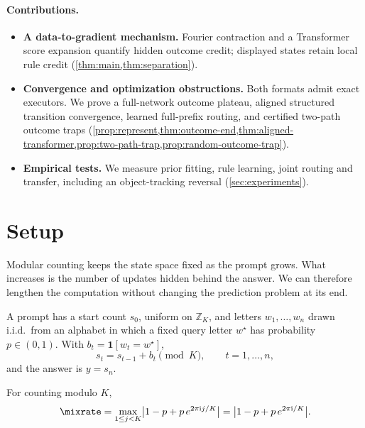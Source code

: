 \paragraph{Contributions.}
\begin{itemize}[leftmargin=*,itemsep=3pt,topsep=3pt]
\item \textbf{A data-to-gradient mechanism.} Fourier contraction and a Transformer
score expansion quantify hidden outcome credit; displayed states retain local rule
credit (\cref{thm:main,thm:separation}).
\item \textbf{Convergence and optimization obstructions.} Both formats admit
exact executors. We prove a full-network outcome plateau, aligned structured
transition convergence, learned full-prefix routing, and certified two-path outcome traps
(\cref{prop:represent,thm:outcome-end,thm:aligned-transformer,prop:two-path-trap,prop:random-outcome-trap}).
\item \textbf{Empirical tests.} We measure prior fitting, rule learning, joint routing
and transfer, including an object-tracking reversal (\cref{sec:experiments}).
\end{itemize}

\section{Setup}
\label{sec:setup}
\label{sec:setting}

Modular counting keeps the state space fixed as the prompt grows. What increases is the number of updates hidden behind the
answer. We can therefore lengthen the computation without changing the prediction problem at its end.

\begin{definition}
\label{def:task}
A prompt has a start count $s_0$, uniform on $\mathbb Z_K$, and letters $w_1,\ldots,w_n$ drawn i.i.d.\ from an alphabet
in which a fixed query letter $w^\star$ has probability $p\in(0,1)$. With $b_t=\mathbf 1[w_t=w^\star]$,
\begin{equation}
 s_t=s_{t-1}+b_t\pmod K,\qquad t=1,\ldots,n,
 \label{eq:tracking}
\end{equation}
and the answer is $y=s_n$.
\end{definition}

\begin{definition}
\label{def:lambda}
For counting modulo $K$,
\begin{equation}
 \mixrate=\max_{1\le j<K}\bigl|1-p+p\,e^{2\pi\mathrm ij/K}\bigr|=\bigl|1-p+p\,e^{2\pi\mathrm i/K}\bigr|.
 \label{eq:lambda}
\end{equation}
\end{definition}

